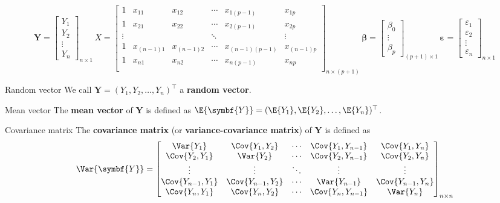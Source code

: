 \[ \symbf{Y}=\begin{bmatrix}
        Y_1    \\
        Y_2    \\
        \vdots \\
        Y_n
    \end{bmatrix}_{n\times 1}\,
    X=
    \begin{bmatrix}
        1      & x_{11}     & x_{12}     & \cdots & x_{1(p-1)}     & x_{1p}     \\
        1      & x_{21}     & x_{22}     & \cdots & x_{2(p-1)}     & x_{2p}     \\
        \vdots &            &            & \ddots &                & \vdots     \\
        1      & x_{(n-1)1} & x_{(n-1)2} & \cdots & x_{(n-1)(p-1)} & x_{(n-1)p} \\
        1      & x_{n1}     & x_{n2}     & \cdots & x_{n(p-1)}     & x_{np}     \\
    \end{bmatrix}_{n\times(p+1)}\,
    \symbf{\beta}=
    \begin{bmatrix}
        \beta_0 \\
        \vdots  \\
        \beta_p
    \end{bmatrix}_{(p+1)\times 1}\,
    \symbf{\varepsilon}=\begin{bmatrix}
        \varepsilon_1 \\
        \varepsilon_2 \\
        \vdots        \\
        \varepsilon_n
    \end{bmatrix}_{n\times 1} \]
\begin{Definition}{Random vector}{}
    We call $ \symbf{Y}=(Y_1,Y_2,\ldots,Y_{n})^\top $
    a \textbf{random vector}.
\end{Definition}
\begin{Definition}{Mean vector}{}
    The \textbf{mean vector} of $ \symbf{Y} $ is defined as
    $ \E{\symbf{Y}}=(\E{Y_1},\E{Y_2},\ldots,\E{Y_n})^\top $.
\end{Definition}
\begin{Definition}{Covariance matrix}{}
    The \textbf{covariance matrix} (or \textbf{variance-covariance matrix}) of $ \symbf{Y} $ is defined as
    \[ \Var{\symbf{Y}}=\begin{bmatrix}
            \Var{Y_1}         & \Cov{Y_1,Y_2}     & \cdots & \Cov{Y_1,Y_{n-1}} & \Cov{Y_1,Y_n}     \\
            \Cov{Y_2,Y_1}     & \Var{Y_2}         & \cdots & \Cov{Y_2,Y_{n-1}} & \Cov{Y_2,Y_n}     \\
            \vdots            & \vdots            & \ddots & \vdots            & \vdots            \\
            \Cov{Y_{n-1},Y_1} & \Cov{Y_{n-1},Y_2} & \cdots & \Var{Y_{n-1}}     & \Cov{Y_{n-1},Y_n} \\
            \Cov{Y_n,Y_1}     & \Cov{Y_n,Y_2}     & \cdots & \Cov{Y_n,Y_{n-1}} & \Var{Y_n}
        \end{bmatrix}_{n\times n} \]
\end{Definition}
